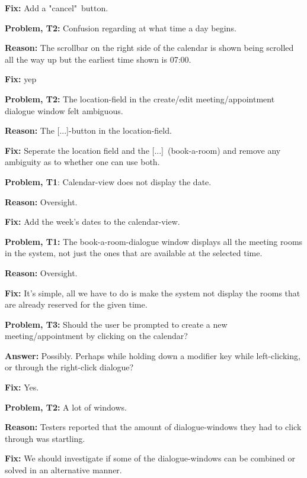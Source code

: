 \documentclass{article}
\begin{document}
\textbf{Fix:} Add a "cancel"\ button.

\bigskip

\textbf{Problem, T2:} Confusion regarding at what time a day begins.

\textbf{Reason:} The scrollbar on the right side of the calendar is shown
being scrolled all the way up but the earliest time shown is 07:00.

\textbf{Fix:} yep

\bigskip

\textbf{Problem, T2:} The location-field in the create/edit
meeting/appointment dialogue window felt ambiguous.

\textbf{Reason:} The [...]-button in the location-field.

\textbf{Fix:} Seperate the location field and the [...]\ (book-a-room) and
remove any ambiguity as to whether one can use both.

\bigskip

\textbf{Problem, T1}: Calendar-view does not display the date.

\textbf{Reason:} Oversight.

\textbf{Fix:} Add the week's dates to the calendar-view.

\bigskip

\textbf{Problem, T1:} The book-a-room-dialogue window displays all the
meeting rooms in the system, not just the ones that are available at the
selected time.

\textbf{Reason:} Oversight.

\textbf{Fix:} It's simple, all we have to do is make the system not display
the rooms that are already reserved for the given time.

\bigskip

\textbf{Problem, T3:} Should the user be prompted to create a new
meeting/appointment by clicking on the calendar?

\textbf{Answer:} Possibly. Perhaps while holding down a modifier key while
left-clicking, or through the right-click dialogue?

\textbf{Fix:} Yes.

\bigskip

\textbf{Problem, T2:} A lot of windows.

\textbf{Reason:} Testers reported that the amount of dialogue-windows they
had to click through was startling.

\textbf{Fix:} We should investigate if some of the dialogue-windows can be
combined or solved in an alternative manner.
\end{document}
